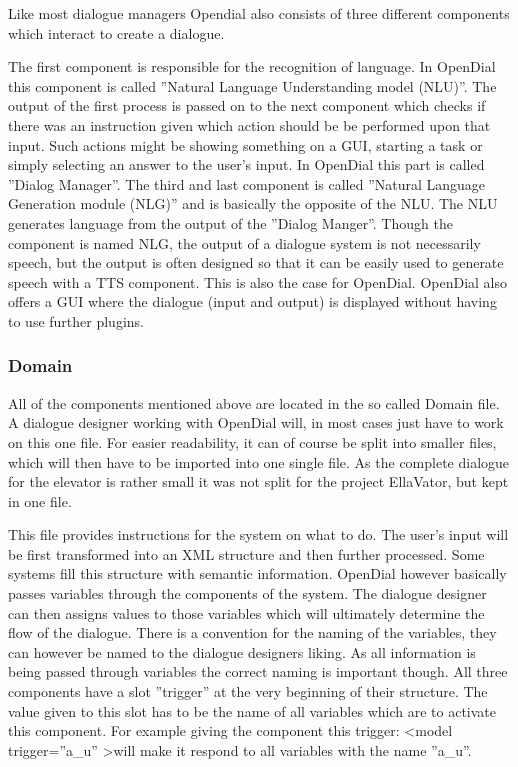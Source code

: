 \documentclass[a4paper, 12pt]{article}
\begin{document}
Like most dialogue managers Opendial also consists of three different components which interact to create a dialogue. 

The first component is responsible for the recognition of language. 
In OpenDial this component is called ”Natural Language Understanding model (NLU)”. 
The output of the first process is passed on to the next component which checks if there was an instruction given which action should be be performed upon that input. 
Such actions might be showing something on a GUI, starting a task or simply selecting an answer to the user's input. 
In OpenDial this part is called ”Dialog Manager”.
The third and last component is called ”Natural Language Generation module (NLG)” and is basically the opposite of the NLU. 
The NLU generates language from the output of the ”Dialog Manger”. 
Though the component is named NLG, the output of a dialogue system is not necessarily speech, but the output is often designed so that it can be easily used to generate speech with a TTS component. 
This is also the case for OpenDial. 
OpenDial also offers a GUI where the dialogue (input and output) is displayed without having to use further plugins.

\subsubsection{Domain}

All of the components mentioned above are located in the so called Domain file.
A dialogue designer working with OpenDial will, in most cases just have to work on this one file. 
For easier readability, it can of course be split into smaller files, which will then have to be imported into one single file. 
As the complete dialogue for the elevator is rather small it was not split for the project EllaVator, but kept in one file. \newline

This file provides instructions for the system on what to do.
The user's input will be first transformed into an XML structure and then further processed.
Some systems fill this structure with semantic information. 
OpenDial however basically passes variables through the components of the system. 
The dialogue designer can then assigns values to those variables which will ultimately determine the flow of the dialogue. 
There is a convention for the naming of the variables, they can however be named to the dialogue designers liking. 
As all information is being passed through variables the correct naming is important though. 
All three components have a slot ”trigger” at the very beginning of their structure. 
The value given to this slot has to be the name of all variables which are to activate this component.
For example giving the component this trigger: 
\textless model trigger=”a\_u” \textgreater will make it respond to all variables with the name ”a\_u”. \\
\end{document}
